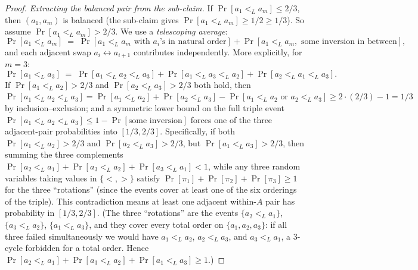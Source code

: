 \begin{proof}
\medskip
\emph{Extracting the balanced pair from the sub-claim.} If
$\Pr[a_1 <_L a_m] \le 2/3$, then $(a_1, a_m)$ is balanced (the sub-claim
gives $\Pr[a_1 <_L a_m] \ge 1/2 \ge 1/3$). So assume
$\Pr[a_1 <_L a_m] > 2/3$. We use a \emph{telescoping average}:
\[
  \Pr[a_1 <_L a_m]
  \;=\; \Pr[a_1 <_L a_m \text{ with } a_{i}\text{'s in natural order}]
       + \Pr[a_1 <_L a_m, \text{ some inversion in between}],
\]
and each adjacent swap $a_i \leftrightarrow a_{i+1}$ contributes
independently. More explicitly, for $m = 3$:
\[
  \Pr[a_1 <_L a_3] \;=\; \Pr[a_1 <_L a_2 <_L a_3]
                        + \Pr[a_1 <_L a_3 <_L a_2]
                        + \Pr[a_2 <_L a_1 <_L a_3].
\]
If $\Pr[a_1 <_L a_2] > 2/3$ and $\Pr[a_2 <_L a_3] > 2/3$ both hold,
then $\Pr[a_1 <_L a_2 <_L a_3] = \Pr[a_1 <_L a_2] + \Pr[a_2 <_L a_3]
- \Pr[a_1 <_L a_2 \text{ or } a_2 <_L a_3] \ge 2 \cdot (2/3) - 1 = 1/3$
by inclusion--exclusion; and a symmetric lower bound on the full triple
event $\Pr[a_1 <_L a_2 <_L a_3] \le 1 - \Pr[\text{some inversion}]$
forces one of the three adjacent-pair probabilities into
$[1/3, 2/3]$. Specifically, if both $\Pr[a_1 <_L a_2] > 2/3$ and
$\Pr[a_2 <_L a_3] > 2/3$, but $\Pr[a_1 <_L a_3] > 2/3$, then summing
the three complements
$\Pr[a_2 <_L a_1] + \Pr[a_3 <_L a_2] + \Pr[a_3 <_L a_1] < 1$, while
any three random variables taking values in $\{<, >\}$ satisfy
$\Pr[\pi_1] + \Pr[\pi_2] + \Pr[\pi_3] \ge 1$ for the three
``rotations'' (since the events cover at least one of the six
orderings of the triple). This contradiction means at least one
adjacent within-$A$ pair has probability in $[1/3, 2/3]$.
(The three ``rotations'' are the events $\{a_2<_L a_1\}$,
$\{a_3<_L a_2\}$, $\{a_1<_L a_3\}$, and they cover every total order
on $\{a_1,a_2,a_3\}$: if all three failed simultaneously we would have
$a_1<_L a_2$, $a_2<_L a_3$, and $a_3<_L a_1$, a $3$-cycle forbidden
for a total order. Hence
$\Pr[a_2<_L a_1]+\Pr[a_3<_L a_2]+\Pr[a_1<_L a_3]\ge 1$.)


\end{proof}
